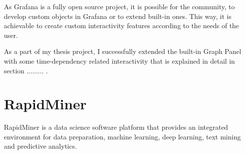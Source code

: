 As Grafana is a fully open source project, it is possible for the community, to develop custom objects in Grafana or to extend built-in ones. This way, it is achievable to create custom interactivity features according to the needs of the user.

As a part of my thesis project, I successfully extended the built-in Graph Panel with some time-dependency related interactivity that is explained in detail in section ......... .



\section{RapidMiner}


RapidMiner is a data science software platform that provides an integrated environment for data preparation, machine learning, deep learning, text mining and predictive analytics.

